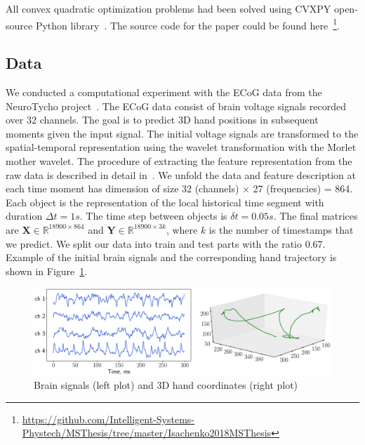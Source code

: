 \documentclass[preprint,authoryear,12pt]{elsarticle}
\theoremstyle{definition}
\newcommand{\bY}{\mathbf{Y}}
\newcommand{\bX}{\mathbf{X}}
\newcommand{\bbR}{\mathbb{R}}
\begin{document}
{\color{red} All convex quadratic optimization problems had been solved using CVXPY open-source Python library~\citep{diamond2016cvxpy,agrawal2018rewriting}. The source code for the paper could be found here~\footnote{\href{https://github.com/Intelligent-Systems-Phystech/MSThesis/tree/master/Isachenko2018MSThesis}{https://github.com/Intelligent-Systems-Phystech/MSThesis/tree/master/Isachenko2018MSThesis}}}.

\subsection{Data}

We conducted a computational experiment with the ECoG data from the NeuroTycho project~\citep{shimoda2012decoding,motrenko2018multi}.
The ECoG data consist of brain voltage signals recorded over 32 channels.
The goal is to predict 3D hand positions in subsequent moments given the input signal.
The initial voltage signals are transformed to the spatial-temporal representation using the wavelet transformation with the Morlet mother wavelet.
The procedure of extracting the feature representation from the raw data is described in detail in~\citep{chao2010long,eliseyev2016penalized}.
We unfold the data and feature description at each time moment has dimension of size 32 (channels) $\times$ 27 (frequencies) = 864.
Each object is the representation of the local historical time segment with duration $\Delta t = 1s$. The time step between objects is $\delta t =  0.05s$.
The final matrices are $\bX \in \bbR^{18900 \times 864}$ and $\bY \in \bbR^{18900 \times 3k}$, where $k$ is the number of timestamps that we predict.
We split our data into train and test parts with the ratio 0.67. 
Example of the initial brain signals and the corresponding hand trajectory is shown in Figure~\ref{fig:ecog_data}.

\begin{figure}
	\centering
	\includegraphics[width=\linewidth]{ecog_data}
	\caption{Brain signals (left plot) and 3D hand coordinates (right plot)}
	\label{fig:ecog_data}
\end{figure}
\end{document}
